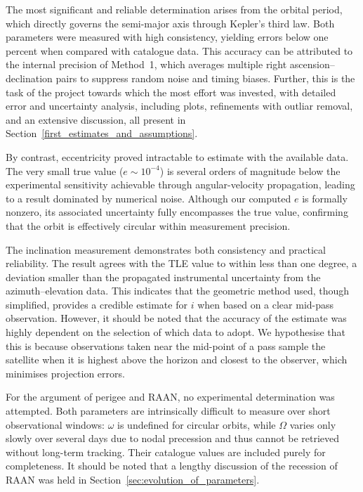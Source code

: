 \documentclass{article}
\begin{document}
 The most significant and reliable determination arises from the orbital period, which directly governs the semi-major axis through Kepler’s third law. Both parameters were measured with high consistency, yielding errors below one percent when compared with catalogue data. This accuracy can be attributed to the internal precision of Method~1, which averages multiple right ascension–declination pairs to suppress random noise and timing biases. Further, this is the task of the project towards which the most effort was invested, with detailed error and uncertainty analysis, including plots, refinements with outliar removal, and an extensive discussion, all present in Section~\ref{first_estimates_and_assumptions}.

By contrast, eccentricity proved intractable to estimate with the available data. The very small true value ($e \sim 10^{-4}$) is several orders of magnitude below the experimental sensitivity achievable through angular-velocity propagation, leading to a result dominated by numerical noise. Although our computed $e$ is formally nonzero, its associated uncertainty fully encompasses the true value, confirming that the orbit is effectively circular within measurement precision.

The inclination measurement demonstrates both consistency and practical reliability. The result agrees with the TLE value to within less than one degree, a deviation smaller than the propagated instrumental uncertainty from the azimuth–elevation data. This indicates that the geometric method used, though simplified, provides a credible estimate for $i$ when based on a clear mid-pass observation. However, it should be noted that the accuracy of the estimate was highly dependent on the selection of which data to adopt. We hypothesise that this is because observations taken near the mid-point of a pass sample the satellite when it is highest above the horizon and closest to the observer, which minimises projection errors.

For the argument of perigee and RAAN, no experimental determination was attempted. Both parameters are intrinsically difficult to measure over short observational windows: $\omega$ is undefined for circular orbits, while $\Omega$ varies only slowly over several days due to nodal precession and thus cannot be retrieved without long-term tracking. Their catalogue values are included purely for completeness. It should be noted that a lengthy discussion of the recession of RAAN was held in Section~\ref{sec:evolution_of_parameters}.
\end{document}
